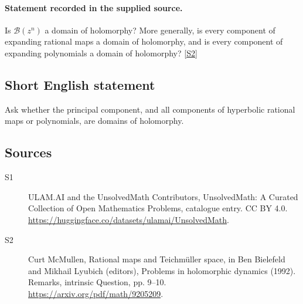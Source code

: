 \documentclass[11pt]{article}
\newcommand{\sref}[2]{\hyperlink{source:#1:#2}{[S#2]}}
\begin{document}
\paragraph{Statement recorded in the supplied source.}
Is $\mathcal B(z^n)$ a domain of holomorphy? More generally, is every component of expanding rational maps a domain of holomorphy, and is every component of expanding polynomials a domain of holomorphy? \sref{statement}{2}
\subsection{Short English statement}
Ask whether the principal component, and all components of hyperbolic rational maps or polynomials, are domains of holomorphy.
\subsection{Sources}
\begin{description}
\item[\hypertarget{source:statement:1}{S1}] ULAM.AI and the UnsolvedMath Contributors, UnsolvedMath: A Curated Collection of Open Mathematics Problems, catalogue entry. CC BY 4.0. \url{https://huggingface.co/datasets/ulamai/UnsolvedMath}.
\item[\hypertarget{source:statement:2}{S2}] Curt McMullen, Rational maps and Teichmüller space, in Ben Bielefeld and Mikhail Lyubich (editors), Problems in holomorphic dynamics (1992). Remarks, intrinsic Question, pp. 9–10. \url{https://arxiv.org/pdf/math/9205209}.
\end{description}
\label{end:statement}
\end{document}
